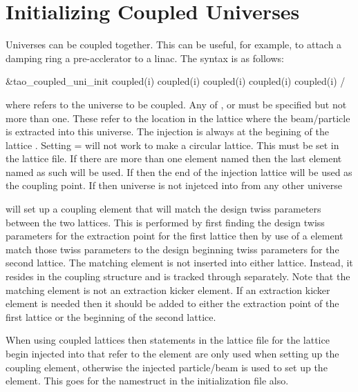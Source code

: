 \section{Initializing Coupled Universes}
\label{s:coupled_uni}

Universes can be coupled together. This can be useful, for example, to attach a
damping ring a pre-acclerator to a linac. The syntax is as follows:
\begin{example}
  &tao_coupled_uni_init
    coupled(i)%
    coupled(i)%
    coupled(i)%
    coupled(i)%
    coupled(i)%
  /
\end{example}
where  refers to the universe to be coupled. Any of ,
 or
 must be specified but not more than one. These refer to the location in the
lattice where the beam/particle is extracted into this universe. 
The injection is always at the begining of
the lattice . Setting  = 
will not work to make a circular lattice. This must be set in the lattice file.
If there are more than one element named  then the last element
named as such will be used. If  then the end of the injection 
lattice will be used as
the coupling point. If  then universe  is not
injetced into from any other universe

 will set up a coupling element that will match the design twiss
parameters between the two lattices. This is performed by first finding the
design twiss parameters for the extraction point for the first lattice then by
use of a \bmad {} element match those twiss parameters to the design
beginning twiss parameters for the second lattice. The matching element is not
inserted into either lattice. Instead, it resides in the \tao coupling structure and
is tracked through separately. Note that the matching element is not an
extraction kicker element. If an extraction kicker element is needed then it
should be added to either the extraction point of the first lattice or the
beginning of the second lattice.

When using coupled lattices then statements in the lattice file for the lattice
begin injected into that refer to the  element are only used when setting
up the coupling element, otherwise the injected particle/beam is used to set up
the  element. This goes for the  namestruct in
the initialization file also.

